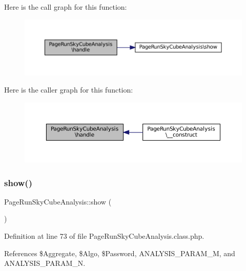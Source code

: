 Here is the call graph for this function\+:\nopagebreak
\begin{figure}[H]
\begin{center}
\leavevmode
\includegraphics[width=350pt]{class_page_run_sky_cube_analysis_a48e0977cfbadfc0696a82bd017f2c563_cgraph}
\end{center}
\end{figure}
Here is the caller graph for this function\+:\nopagebreak
\begin{figure}[H]
\begin{center}
\leavevmode
\includegraphics[width=350pt]{class_page_run_sky_cube_analysis_a48e0977cfbadfc0696a82bd017f2c563_icgraph}
\end{center}
\end{figure}
\mbox{\label{class_page_run_sky_cube_analysis_a09100b5db3766d25d00cd620091cad54}} 
\subsubsection{\texorpdfstring{show()}{show()}}
{\footnotesize\ttfamily Page\+Run\+Sky\+Cube\+Analysis\+::show (\begin{DoxyParamCaption}{ }\end{DoxyParamCaption})\hspace{0.3cm}{\ttfamily [protected]}}



Definition at line 73 of file Page\+Run\+Sky\+Cube\+Analysis.\+class.\+php.



References \$\+Aggregate, \$\+Algo, \$\+Password, A\+N\+A\+L\+Y\+S\+I\+S\+\_\+\+P\+A\+R\+A\+M\+\_\+M, and A\+N\+A\+L\+Y\+S\+I\+S\+\_\+\+P\+A\+R\+A\+M\+\_\+N.



